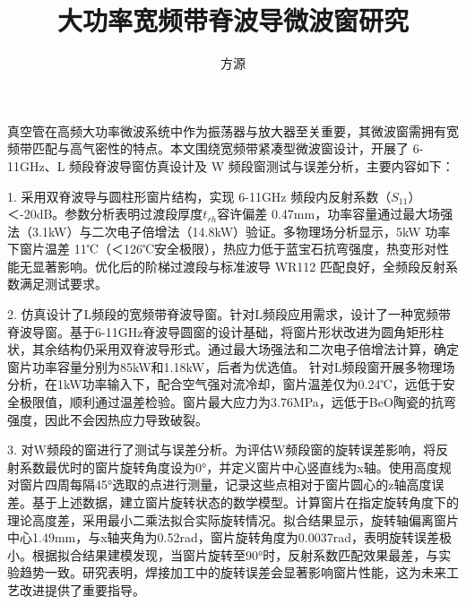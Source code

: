 \documentclass[master]{thesis-uestc}
\title{大功率宽频带脊波导微波窗研究}{Research on High-Power Broadband Ridge Waveguide Microwave Window} %
\author{方源}{Fang Yuan} %
\begin{document}
\makecover %
\originalitydeclaration %
\begin{chineseabstract}
    真空管在高频大功率微波系统中作为振荡器与放大器至关重要，其微波窗需拥有宽频带匹配与高气密性的特点。本文围绕宽频带紧凑型微波窗设计，开展了 6-11GHz、L 频段脊波导窗仿真设计及 W 频段窗测试与误差分析，主要内容如下：

    1. 采用双脊波导与圆柱形窗片结构，实现 6-11GHz 频段内反射系数（\(S_{11}\)）＜-20dB。参数分析表明过渡段厚度\(t_{rh}\)容许偏差 0.47mm，功率容量通过最大场强法（3.1kW）与二次电子倍增法（14.8kW）验证。多物理场分析显示，5kW 功率下窗片温差 11℃（＜126℃安全极限），热应力低于蓝宝石抗弯强度，热变形对性能无显著影响。优化后的阶梯过渡段与标准波导 WR112 匹配良好，全频段反射系数满足测试要求。

    2. 仿真设计了L频段的宽频带脊波导窗。针对L频段应用需求，设计了一种宽频带脊波导窗。基于6-11GHz脊波导圆窗的设计基础，将窗片形状改进为圆角矩形柱状，其余结构仍采用双脊波导形式。通过最大场强法和二次电子倍增法计算，确定窗片功率容量分别为85kW和1.18kW，后者为优选值。
    针对L频段窗开展多物理场分析，在1kW功率输入下，配合空气强对流冷却，窗片温差仅为0.24℃，远低于安全极限值，顺利通过温差检验。窗片最大应力为3.76MPa，远低于BeO陶瓷的抗弯强度，因此不会因热应力导致破裂。

    3. 对W频段的窗进行了测试与误差分析。为评估W频段窗的旋转误差影响，将反射系数最优时的窗片旋转角度设为0°，并定义窗片中心竖直线为x轴。使用高度规对窗片四周每隔45°选取的点进行测量，记录这些点相对于窗片圆心的z轴高度误差。基于上述数据，建立窗片旋转状态的数学模型。计算窗片在指定旋转角度下的理论高度差，采用最小二乘法拟合实际旋转情况。拟合结果显示，旋转轴偏离窗片中心1.49mm，与x轴夹角为0.52rad，窗片旋转角度为0.0037rad，表明旋转误差极小。根据拟合结果建模发现，当窗片旋转至90°时，反射系数匹配效果最差，与实验趋势一致。研究表明，焊接加工中的旋转误差会显著影响窗片性能，这为未来工艺改进提供了重要指导。

\end{chineseabstract}
\end{document}
